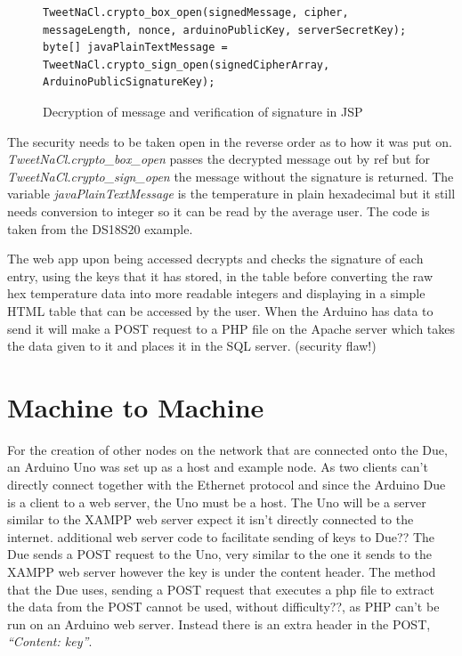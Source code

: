 \begin{figure}[H]
\begin{lstlisting}[style=Java]
TweetNaCl.crypto_box_open(signedMessage, cipher, messageLength, nonce, arduinoPublicKey, serverSecretKey);
byte[] javaPlainTextMessage = TweetNaCl.crypto_sign_open(signedCipherArray, ArduinoPublicSignatureKey);
\end{lstlisting}
\caption{Decryption of message and verification of signature in JSP}
\label{snip:decryptjsp}
\end{figure}

The security needs to be taken open in the reverse order as to how it was put on. \emph{TweetNaCl.crypto\_box\_open} passes the decrypted message out by ref but for \emph{TweetNaCl.crypto\_sign\_open} the message without the signature is returned. The variable \emph{javaPlainTextMessage} is the temperature in plain hexadecimal but it still needs conversion to integer so it can be read by the average user. The code is taken from the DS18S20 example.

The web app upon being accessed decrypts and checks the signature of each entry, using the keys that it has stored, in the table before converting the raw hex temperature data into more readable integers and displaying in a simple HTML table that can be accessed by the user. When the Arduino has data to send it will make a POST request to a PHP file on the Apache server which takes the data given to it and places it in the SQL server. (security flaw!)


\section{Machine to Machine}

For the creation of other nodes on the network that are connected onto the Due, an Arduino Uno was set up as a host and example node. As two clients can't directly connect together with the Ethernet protocol and since the Arduino Due is a client to a web server, the Uno must be a host. The Uno will be a server similar to the XAMPP web server expect it isn't directly connected to the internet. 
additional web server code to facilitate sending of keys to Due??
The Due sends a POST request to the Uno, very similar to the one it sends to the XAMPP web server however the key is under the content header. The method that the Due uses, sending a POST request that executes a php file to extract the data from the POST cannot be used, without difficulty??, as PHP can't be run on an Arduino web server. Instead there is an extra header in the POST, \emph{``Content: key''}.

